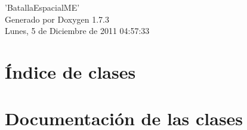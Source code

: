 \documentclass[a4paper]{book}
\begin{document}
\hypersetup{pageanchor=false}
\begin{titlepage}
\vspace*{7cm}
\begin{center}
{\Large 'BatallaEspacialME' }\\
\vspace*{1cm}
{\large Generado por Doxygen 1.7.3}\\
\vspace*{0.5cm}
{\small Lunes, 5 de Diciembre de 2011 04:57:33}\\
\end{center}
\end{titlepage}
\clearemptydoublepage
{}
\tableofcontents
\clearemptydoublepage
{}
\hypersetup{pageanchor=true}
\chapter{Índice de clases}

\chapter{Documentación de las clases}















\printindex
\end{document}
